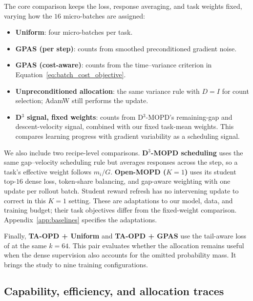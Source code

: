 The core comparison keeps the loss, response averaging, and task weights
fixed, varying how the $16$ micro-batches are assigned:
\begin{itemize}
    \item \textbf{Uniform}: four micro-batches per task.
    \item \textbf{GPAS (per step)}: counts from smoothed preconditioned
    gradient noise.
    \item \textbf{GPAS (cost-aware)}: counts from the time--variance
    criterion in Equation~\ref{eq:batch_cost_objective}.
    \item \textbf{Unpreconditioned allocation}: the same variance rule
    with $D=I$ for count selection; AdamW still performs the update.
    \item \textbf{D$^3$ signal, fixed weights}: counts from D$^3$-MOPD's
    remaining-gap and descent-velocity signal, combined with our fixed
    task-mean weights. This compares learning progress with gradient
    variability as a scheduling signal.
\end{itemize}

We also include two recipe-level comparisons.
\textbf{D$^3$-MOPD scheduling} uses the same gap--velocity scheduling rule but
averages responses across the step, so a task's effective weight follows
$m_i/G$. \textbf{Open-MOPD ($K=1$)} uses its student top-$16$ dense
loss, token-share balancing, and gap-aware weighting with one update per
rollout batch. Student reward refresh has no intervening update to
correct in this $K=1$ setting. These are adaptations to our model, data,
and training budget; their task objectives differ from the fixed-weight
comparison. Appendix~\ref{app:baselines} specifies the adaptations.

Finally, \textbf{TA-OPD + Uniform} and \textbf{TA-OPD + GPAS} use
the tail-aware loss of \citet{huang2026tailaware} at the same $k=64$.
This pair evaluates whether the allocation remains useful when the
dense supervision also accounts for the omitted probability mass.
It brings the study to nine training configurations.

\subsection{Capability, efficiency, and allocation traces}

